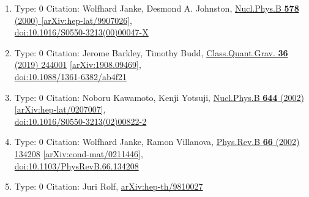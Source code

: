 \documentclass[a4paper,10pt]{article}
\begin{document}
\begin{enumerate}
\begin{enumerate}
  \item Type: 0 Citation: Wolfhard Janke, Desmond A. Johnston, \href{https://www.doi.org/10.1016/S0550-3213(00)00047-X}{Nucl.Phys.B {\bf 578} (2000) }  \href{https://arxiv.org/abs/hep-lat/9907026}{[arXiv:hep-lat/9907026]},\\\href{https://www.doi.org/10.1016/S0550-3213(00)00047-X}{doi:10.1016/S0550-3213(00)00047-X}
  \item Type: 0 Citation: Jerome Barkley, Timothy Budd, \href{https://www.doi.org/10.1088/1361-6382/ab4f21}{Class.Quant.Grav. {\bf 36} (2019) 244001}  \href{https://arxiv.org/abs/1908.09469}{[arXiv:1908.09469]},\\\href{https://www.doi.org/10.1088/1361-6382/ab4f21}{doi:10.1088/1361-6382/ab4f21}
  \item Type: 0 Citation: Noboru Kawamoto, Kenji Yotsuji, \href{https://www.doi.org/10.1016/S0550-3213(02)00822-2}{Nucl.Phys.B {\bf 644} (2002) }  \href{https://arxiv.org/abs/hep-lat/0207007}{[arXiv:hep-lat/0207007]},\\\href{https://www.doi.org/10.1016/S0550-3213(02)00822-2}{doi:10.1016/S0550-3213(02)00822-2}
  \item Type: 0 Citation: Wolfhard Janke, Ramon Villanova, \href{https://www.doi.org/10.1103/PhysRevB.66.134208}{Phys.Rev.B {\bf 66} (2002) 134208}  \href{https://arxiv.org/abs/cond-mat/0211446}{[arXiv:cond-mat/0211446]},\\\href{https://www.doi.org/10.1103/PhysRevB.66.134208}{doi:10.1103/PhysRevB.66.134208}
  \item Type: 0 Citation: Juri Rolf, \href{https://arxiv.org/abs/hep-th/9810027}{arXiv:hep-th/9810027}

\end{enumerate}
\end{enumerate}
\end{document}
